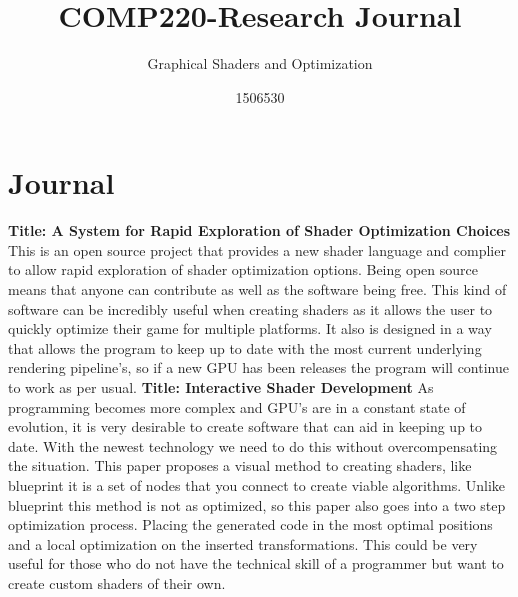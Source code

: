 \documentclass{scrartcl}
\title{COMP220-Research Journal}
\subtitle{Graphical Shaders and Optimization}
\author{1506530}
\begin{document}
	
	
	\maketitle
	\section{Journal}
	
	\newline
	\newline
	\textbf{Title: A System for Rapid Exploration of Shader Optimization Choices}\cite{He}
	\newline
This is an open source project that provides a new shader language and complier to allow rapid exploration of shader optimization options. Being open source means that anyone can contribute as well as the software being free. This kind of software can be incredibly useful when creating shaders as it allows the user to quickly optimize their game for multiple platforms. It also is designed in a way that allows the program to keep up to date with the most current underlying rendering pipeline's, so if a new GPU has been releases the program will continue to work as per usual.
	\newline
	\newline
	\newline
	\textbf{Title: Interactive Shader Development}\cite{Jensen}
	\newline
As programming becomes more complex and GPU's are in a constant state of evolution, it is very desirable to create software that can aid in keeping up to date. With the newest technology we need to do this without overcompensating the situation. This paper proposes a visual method to creating shaders, like blueprint it is a set of nodes that you connect to create viable algorithms. Unlike blueprint this method is not as optimized, so this paper also goes into a two step optimization process. Placing the generated code in the most optimal positions and a local optimization on the inserted transformations. This could be very useful for those who do not have the technical skill of a programmer but want to create custom shaders of their own.
	\newline
	\newline
	\newline
\end{document}
